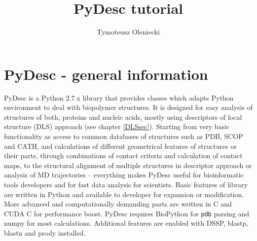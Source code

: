 \documentclass{article}
\title{PyDesc tutorial}
\author{Tymoteusz Oleniecki }
\date{}
\begin{document}
\maketitle

\section{PyDesc - general information}
    PyDesc is a Python 2.7.x library that provides classes which adapts Python environment to deal with biopolymer structures. It is designed for easy analysis of structures of both, proteins and nucleic acids, mostly using descriptors of local structure (DLS) approach (see chapter \ref{DLSsec}). Starting from very basic functionality as access to common databases of structures such as PDB, SCOP and CATH, and calculations of different geometrical features of structures or their parts, through combinations of contact criteria and calculation of contact maps, to the structural alignment of multiple structures in descriptor approach or analysis of MD trajectories -- everything makes PyDesc useful for bioinformatic tools developers and for fast data analysis for scientists.
    Basic features of library are written in Python and available to developer for expansion or modification. More advanced and computationally demanding parts are written in C and CUDA C for performance boost.
    PyDesc requires BioPython for \texttt{pdb} parsing and numpy for most calculations. Additional features are enabled with DSSP, blastp, blastn and prody installed.
\end{document}
